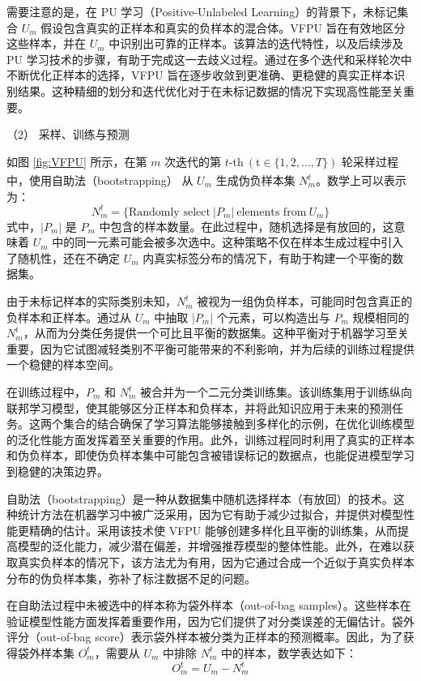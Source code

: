需要注意的是，在 PU 学习（Positive-Unlabeled Learning）的背景下，未标记集合 ${{U}_{m}}$ 假设包含真实的正样本和真实的负样本的混合体。VFPU 旨在有效地区分这些样本，并在 ${{U}_{m}}$ 中识别出可靠的正样本。该算法的迭代特性，以及后续涉及 PU 学习技术的步骤，有助于完成这一去歧义过程。通过在多个迭代和采样轮次中不断优化正样本的选择，VFPU 旨在逐步收敛到更准确、更稳健的真实正样本识别结果。这种精细的划分和迭代优化对于在未标记数据的情况下实现高性能至关重要。

（2） 采样、训练与预测

如图 \ref{fig:VFPU} 所示，在第 $m$ 次迭代的第 $t\text{-th} \ (\text{t}\in \{1,2,...,T\})$ 轮采样过程中，使用自助法（bootstrapping）\textsuperscript{\cite{mordelet2014bagging}} 从 $U_{m}$ 生成伪负样本集 $N_{m}^{t}$。数学上可以表示为：
\begin{equation}
	N_{m}^{t}=\{ \text{Randomly select} \ |P_{m}| \ \text{elements from} \ U_{m} \}
\end{equation}
式中，$|P_{m}|$ 是 $P_{m}$ 中包含的样本数量。在此过程中，随机选择是有放回的，这意味着 $U_{m}$ 中的同一元素可能会被多次选中。这种策略不仅在样本生成过程中引入了随机性，还在不确定 $U_{m}$ 内真实标签分布的情况下，有助于构建一个平衡的数据集。

由于未标记样本的实际类别未知，$N_{m}^{t}$ 被视为一组伪负样本，可能同时包含真正的负样本和正样本。通过从 $U_{m}$ 中抽取 $|P_{m}|$ 个元素，可以构造出与 $P_{m}$ 规模相同的 $N_{m}^{t}$，从而为分类任务提供一个可比且平衡的数据集。这种平衡对于机器学习至关重要，因为它试图减轻类别不平衡可能带来的不利影响，并为后续的训练过程提供一个稳健的样本空间。

在训练过程中，$P_{m}$ 和 $N_{m}^{t}$ 被合并为一个二元分类训练集。该训练集用于训练纵向联邦学习模型，使其能够区分正样本和负样本，并将此知识应用于未来的预测任务。这两个集合的结合确保了学习算法能够接触到多样化的示例，在优化训练模型的泛化性能方面发挥着至关重要的作用。此外，训练过程同时利用了真实的正样本和伪负样本，即使伪负样本集中可能包含被错误标记的数据点，也能促进模型学习到稳健的决策边界。

自助法（bootstrapping）是一种从数据集中随机选择样本（有放回）的技术。这种统计方法在机器学习中被广泛采用，因为它有助于减少过拟合，并提供对模型性能更精确的估计。采用该技术使 VFPU 能够创建多样化且平衡的训练集，从而提高模型的泛化能力，减少潜在偏差，并增强推荐模型的整体性能。此外，在难以获取真实负样本的情况下，该方法尤为有用，因为它通过合成一个近似于真实负样本分布的伪负样本集，弥补了标注数据不足的问题。

在自助法过程中未被选中的样本称为袋外样本（out-of-bag samples）。这些样本在验证模型性能方面发挥着重要作用，因为它们提供了对分类误差的无偏估计。袋外评分（out-of-bag score）表示袋外样本被分类为正样本的预测概率。因此，为了获得袋外样本集 $O_{m}^{t}$，需要从 $U_{m}$ 中排除 $N_{m}^{t}$ 中的样本，数学表达如下：
\begin{equation}
	O_{m}^{t}=U_{m}-N_{m}^{t}
\end{equation}

